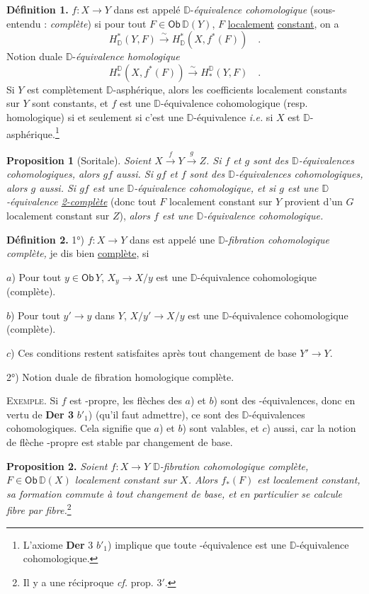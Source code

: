 \documentclass[11pt,leqno]{article}
\newcommand{\printedpage}[1]{\marginpar{\footnotesize p.~#1}}
\newcommand{\msp}[1]{\marginpar{\footnotesize [#1]}}
\newcommand{\DD}{\mathbb{D}}
\newcommand{\Dia}{\mathsf{Dia}}
\newcommand{\Ob}{\mathsf{Ob}}
\newcommand{\Hot}{\mathsf{Hot}}
\begin{document}
\msp{page 101}
\textbf{Définition 1.} $f : X \to Y$ dans \Dia{} est appelé $\DD$-\textit{équivalence cohomologique} (sous-entendu : \textit{complète}) si pour tout $F \in \Ob\,\DD(Y)$, $F$ \underline{localement} \underline{constant}, on a
\[
H^*_{\DD}(Y,F) \overset{\sim}{\longrightarrow} H^*_{\DD}(X, f^*(F)) \quad .
\]
Notion duale $\DD$-\textit{équivalence homologique}
\[
H_*^{\DD}(X, f^*(F)) \overset{\sim}{\longrightarrow} H_*^{\DD}(Y,F) \quad .
\]
Si $Y$ est complètement $\DD$-asphérique, alors les coefficients localement constants sur $Y$ sont constants, et $f$ est une $\DD$-équivalence cohomologique (resp. homologique) si et seulement si c’est une $\DD$-équivalence \textit{i.e.} si $X$ est $\DD$-asphérique.\footnote[53]{L’axiome \textbf{Der} 3 $b'_1$) implique que toute \Hot-équivalence est une $\DD$-équivalence cohomologique.}

\textbf{Proposition 1} (Soritale). \textit{Soient $X \overset{f}{\to} Y \overset{g}{\to} Z$. Si $f$ et $g$ sont des $\DD$-équivalences cohomologiques, alors $gf$ aussi. Si $gf$ et $f$ sont des $\DD$-équivalences cohomologiques, alors $g$ aussi. Si $gf$ est une $\DD$-équivalence cohomologique, et si $g$ est une $\DD$-équivalence \underline{2-complète}} (donc tout $F$ localement constant sur $Y$ provient d’un $G$ localement constant sur $Z$), \textit{alors $f$ est une $\DD$-équivalence cohomologique.}

\textbf{Définition 2.} 1°) $f : X \to Y$ dans \Dia{} est appelé une $\DD$-\textit{fibration cohomologique complète,} je dis bien \underline{complète}, si

$a$) Pour tout $y \in \Ob\, Y$, $X_y \to X/y$ est une $\DD$-équivalence cohomologique (complète).

$b$) Pour tout $y' \to y$ dans $Y$, $X/y' \to X/y$ est une $\DD$-équivalence cohomologique (complète).

\printedpage{62}

\msp{page 102}
$c$) Ces conditions restent satisfaites après tout changement de base $Y' \to Y$.

2°) Notion duale de fibration homologique complète.

\textsc{Exemple.} Si $f$ est \Hot-propre, les flèches des $a$) et $b$) sont des \Hot-équivalences, donc en vertu de \textbf{Der 3} $b'_1$) (qu’il faut admettre), ce sont des $\DD$-équivalences cohomologiques. Cela signifie que $a$) et $b$) sont valables, et $c$) aussi, car la notion de flèche \Hot-propre est stable par changement de base.

\textbf{Proposition 2.} \textit{Soient $f : X \to Y$ $\DD$-fibration cohomologique complète, $F \in \Ob\,\DD(X)$ localement constant sur $X$. Alors $f_*(F)$ est localement constant, sa formation commute à tout changement de base, et en particulier se calcule fibre par fibre.}\footnote[54]{Il y a une réciproque \textit{cf.} prop. 3$'$.}
\end{document}
